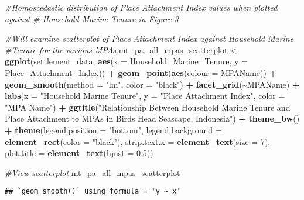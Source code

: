\documentclass[
]{article}
\newenvironment{Shaded}{\begin{snugshade}}{\end{snugshade}}
\newcommand{\AttributeTok}[1]{\textcolor[rgb]{0.13,0.29,0.53}{#1}}
\newcommand{\CommentTok}[1]{\textcolor[rgb]{0.56,0.35,0.01}{\textit{#1}}}
\newcommand{\DecValTok}[1]{\textcolor[rgb]{0.00,0.00,0.81}{#1}}
\newcommand{\FloatTok}[1]{\textcolor[rgb]{0.00,0.00,0.81}{#1}}
\newcommand{\FunctionTok}[1]{\textcolor[rgb]{0.13,0.29,0.53}{\textbf{#1}}}
\newcommand{\NormalTok}[1]{#1}
\newcommand{\OtherTok}[1]{\textcolor[rgb]{0.56,0.35,0.01}{#1}}
\newcommand{\SpecialCharTok}[1]{\textcolor[rgb]{0.81,0.36,0.00}{\textbf{#1}}}
\newcommand{\StringTok}[1]{\textcolor[rgb]{0.31,0.60,0.02}{#1}}
\begin{document}
\begin{Shaded}
\begin{Highlighting}[]
\CommentTok{\#Homoscedastic distribution of Place Attachment Index values when plotted against }
\CommentTok{\# Household Marine Tenure in Figure 3}

\CommentTok{\#Will examine scatterplot of Place Attachment Index against Household Marine }
\CommentTok{\#Tenure for the various MPAs}
\NormalTok{mt\_pa\_all\_mpas\_scatterplot }\OtherTok{\textless{}{-}} \FunctionTok{ggplot}\NormalTok{(settlement\_data, }\FunctionTok{aes}\NormalTok{(}\AttributeTok{x =}\NormalTok{ Household\_Marine\_Tenure,}
                            \AttributeTok{y =}\NormalTok{ Place\_Attachment\_Index)) }\SpecialCharTok{+}
  \FunctionTok{geom\_point}\NormalTok{(}\FunctionTok{aes}\NormalTok{(}\AttributeTok{colour =}\NormalTok{ MPAName)) }\SpecialCharTok{+}
  \FunctionTok{geom\_smooth}\NormalTok{(}\AttributeTok{method =} \StringTok{"lm"}\NormalTok{, }\AttributeTok{color =} \StringTok{"black"}\NormalTok{) }\SpecialCharTok{+}
  \FunctionTok{facet\_grid}\NormalTok{(}\SpecialCharTok{\textasciitilde{}}\NormalTok{MPAName) }\SpecialCharTok{+}
  \FunctionTok{labs}\NormalTok{(}\AttributeTok{x =} \StringTok{"Household Marine Tenure"}\NormalTok{,}
       \AttributeTok{y =} \StringTok{"Place Attachment Index"}\NormalTok{,}
       \AttributeTok{color =} \StringTok{"MPA Name"}\NormalTok{) }\SpecialCharTok{+}
  \FunctionTok{ggtitle}\NormalTok{(}\StringTok{"Relationship Between Household Marine Tenure and Place Attachment to}
\StringTok{          MPAs in Bird\textquotesingle{}s Head Seascape, Indonesia"}\NormalTok{) }\SpecialCharTok{+}
  \FunctionTok{theme\_bw}\NormalTok{() }\SpecialCharTok{+}
  \FunctionTok{theme}\NormalTok{(}\AttributeTok{legend.position =} \StringTok{"bottom"}\NormalTok{,}
        \AttributeTok{legend.background =} \FunctionTok{element\_rect}\NormalTok{(}\AttributeTok{color =} \StringTok{"black"}\NormalTok{),}
        \AttributeTok{strip.text.x =} \FunctionTok{element\_text}\NormalTok{(}\AttributeTok{size =} \DecValTok{7}\NormalTok{),}
        \AttributeTok{plot.title =} \FunctionTok{element\_text}\NormalTok{(}\AttributeTok{hjust =} \FloatTok{0.5}\NormalTok{))}

\CommentTok{\#View scatterplot}
\NormalTok{mt\_pa\_all\_mpas\_scatterplot}
\end{Highlighting}
\end{Shaded}

\begin{verbatim}
## `geom_smooth()` using formula = 'y ~ x'
\end{verbatim}
\end{document}
